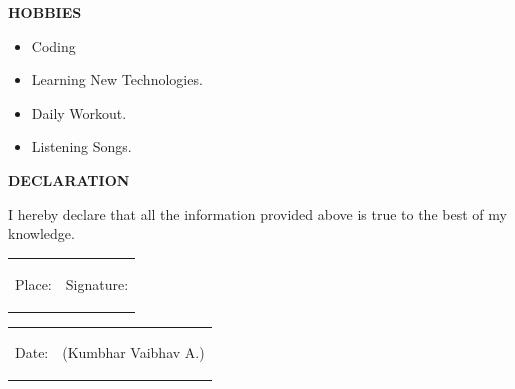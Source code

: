 \documentclass{article}
\begin{document}
\vspace{1cm}


\begin{framed}
	\large{\textbf{HOBBIES}}
\end{framed}
\begin{itemize}
	\item Coding
	\item Learning New Technologies.
	\item Daily Workout.
	\item Listening Songs. 
\end{itemize}


\vspace{1cm}
\begin{framed}
	\large{\textbf{DECLARATION}}
\end{framed}
	\Large{I hereby declare that all the information provided above is true to the best of my knowledge. }


\vspace{3cm}
\begin{tabular}{cc}
\begin{minipage}{0.5\textwidth}
\begin{flushleft}Place:
\end{flushleft}
\end{minipage}
&
\begin{minipage}{0.5\textwidth}
\begin{center}Signature:
\end{center}
\end{minipage}
\end{tabular}


\begin{tabular}{cc}
\begin{minipage}{0.5\textwidth}
\begin{flushleft}Date:
\end{flushleft}
\end{minipage}
&
\begin{minipage}{0.5\textwidth}
\begin{center} (Kumbhar Vaibhav A.)
\end{center}
\end{minipage}
\end{tabular}
\end{document}
